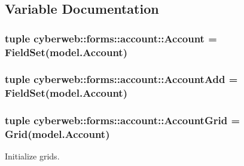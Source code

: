 \subsection{\-Variable \-Documentation}
\hypertarget{namespacecyberweb_1_1forms_1_1account_a95b331bccadb1c7f22dc04a0f247e75a}{
\subsubsection[{\-Account}]{\setlength{\rightskip}{0pt plus 5cm}tuple {\bf cyberweb\-::forms\-::account\-::\-Account} = \-Field\-Set(model.\-Account)}}\label{namespacecyberweb_1_1forms_1_1account_a95b331bccadb1c7f22dc04a0f247e75a}
\hypertarget{namespacecyberweb_1_1forms_1_1account_ad0f68217fd2f32a31a306c8a938c9de3}{
\subsubsection[{\-Account\-Add}]{\setlength{\rightskip}{0pt plus 5cm}tuple {\bf cyberweb\-::forms\-::account\-::\-Account\-Add} = \-Field\-Set(model.\-Account)}}\label{namespacecyberweb_1_1forms_1_1account_ad0f68217fd2f32a31a306c8a938c9de3}
\hypertarget{namespacecyberweb_1_1forms_1_1account_afba7ce0aad975725268d6e15fb963662}{
\subsubsection[{\-Account\-Grid}]{\setlength{\rightskip}{0pt plus 5cm}tuple {\bf cyberweb\-::forms\-::account\-::\-Account\-Grid} = \-Grid(model.\-Account)}}\label{namespacecyberweb_1_1forms_1_1account_afba7ce0aad975725268d6e15fb963662}


\-Initialize grids. 

